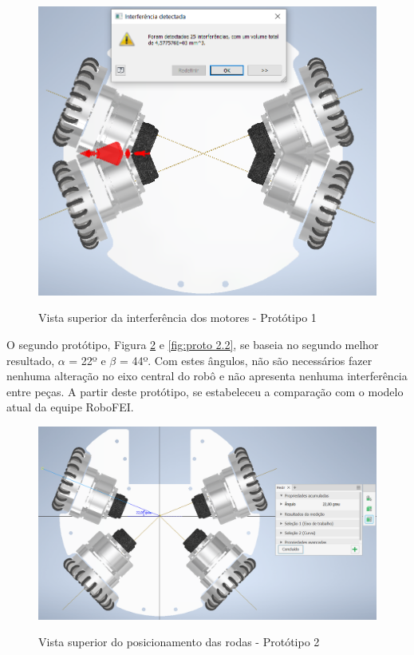 \documentclass[deposito, acronym, symbols]{fei}
\begin{document}
\begin{figure}[!htb]
    \centering
    \caption{Vista superior da interferência dos motores - Protótipo 1}
    \includegraphics[scale=0.5]{Imagens/interferência.png}
    \label{fig:interferência}
\end{figure}

O segundo protótipo, Figura \ref{fig:proto 2.1} e \ref{fig:proto 2.2}, se baseia no segundo melhor resultado, $\alpha$ = 22º e $\beta$ = 44º. Com estes ângulos, não são necessários fazer nenhuma alteração no eixo central do robô e não apresenta nenhuma interferência entre peças. A partir deste protótipo, se estabeleceu a comparação com o modelo atual da equipe RoboFEI.

\begin{figure}[!htb]
    \centering
    \caption{Vista superior do posicionamento das rodas - Protótipo 2}
    \includegraphics[scale=0.4]{Imagens/Vista superior do posicionamento das rodas - Proto 2.1.png}
    \label{fig:proto 2.1}
\end{figure}
\end{document}
